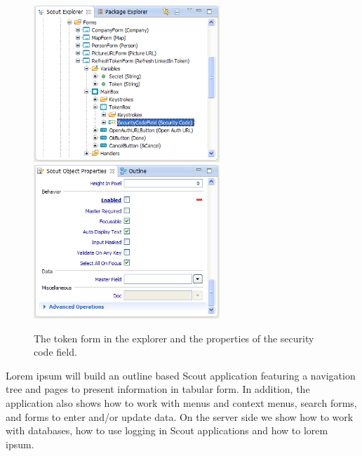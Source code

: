 \documentclass[a4paper,10pt,twoside]{book}
\begin{document}
\begin{figure}
\includegraphics[width=7cm]{tokenform_securitycode_explorer.png} \hspace{5mm}
\includegraphics[width=7cm]{tokenform_securitycode_properties.png}
\caption{The token form in the explorer and the properties of the security code field.}
\end{figure}

Lorem ipsum will build an outline based Scout application featuring a navigation tree and pages to present information in tabular form. 
In addition, the application also shows how to work with menus and context menus, search forms, and forms to enter and/or update data. 
On the server side we show how to work with databases, how to use logging in Scout applications and how to lorem ipsum. 
\end{document}
